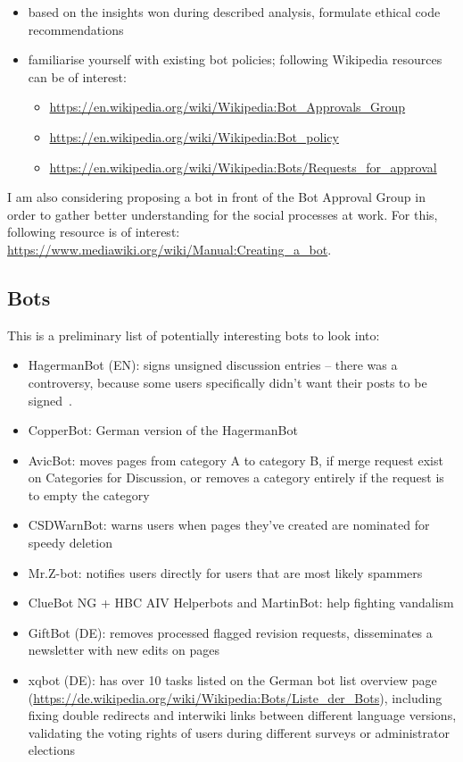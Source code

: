 \documentclass[pdftex,a4paper,11pt]{scrartcl}
\begin{document}
\begin{itemize}
    \item based on the insights won during described analysis, formulate ethical code recommendations
    \item familiarise yourself with existing bot policies; following Wikipedia resources can be of interest:
    \begin{itemize}
        \item \url{https://en.wikipedia.org/wiki/Wikipedia:Bot_Approvals_Group}
        \item \url{https://en.wikipedia.org/wiki/Wikipedia:Bot_policy}
        \item \url{https://en.wikipedia.org/wiki/Wikipedia:Bots/Requests_for_approval}
    \end{itemize}
\end{itemize}

I am also considering proposing a bot in front of the Bot Approval Group in order to gather better understanding for the social processes at work.
For this, following resource is of interest: \url{https://www.mediawiki.org/wiki/Manual:Creating_a_bot}.

\subsection{Bots}

This is a preliminary list of potentially interesting bots to look into:

\begin{itemize}
  \item HagermanBot (EN): signs unsigned discussion entries -- there was a
  controversy, because some users specifically didn't want their posts to be
  signed~\cite{MueDoHer2013}. %
  \item CopperBot: German version of the HagermanBot
  \item AvicBot: moves pages from category A to category B, if merge request exist on Categories for Discussion, or removes a category entirely if the request is to empty the category
  \item CSDWarnBot: warns users when pages they've created are nominated for speedy deletion
  \item Mr.Z-bot: notifies users directly for users that are most likely spammers
  \item ClueBot NG + HBC AIV Helperbots and MartinBot: help fighting vandalism
  \item GiftBot (DE): removes processed flagged revision requests, disseminates a newsletter with new edits on pages
  \item xqbot (DE): has over 10 tasks listed on the German bot list overview page (\url{https://de.wikipedia.org/wiki/Wikipedia:Bots/Liste_der_Bots}), including fixing double redirects and interwiki links between different language versions, validating the voting rights of users during different surveys or administrator elections
\end{itemize}
\end{document}
